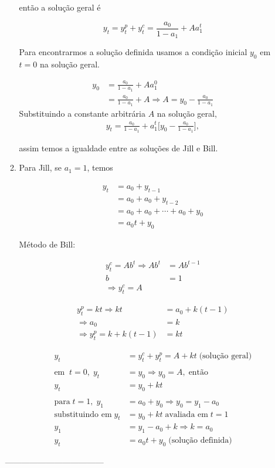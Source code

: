 \begin{enumerate}
\begin{enumerate}
	então a solução geral é
	
	\begin{equation*}
		y_t=y_t^p+y_t^c=\frac{a_0}{1-a_1}+Aa_1^t
	\end{equation*}
	
	Para encontrarmos a solução definida usamos a condição inicial $y_0$ em $t=0$ na solução geral.
	
	\begin{align*}
		y_0&=\frac{a_0}{1-a_1}+Aa_1^0\\
		&= \frac{a_0}{1-a_1}+A \Rightarrow A=y_0-\frac{a_0}{1-a_1}
	\end{align*}
	Substituindo a constante arbitrária $A$ na solução geral, 
	\begin{align*}
		y_t=\frac{a_0}{1-a_1}+a_1^t\bigg[y_0-\frac{a_0}{1-a_1}\bigg],
	\end{align*}
	
	assim temos a igualdade entre as soluções de Jill e Bill.
	
\item Para Jill, se $a_1=1$, temos
	
	\begin{align*}
	y_t&=a_0+y_{t-1}\\
	&=a_0+a_0+y_{t-2}\\
	&=a_0+a_0+\cdots+a_0+y_0\\
	&=a_0t+y_0
	\end{align*}
	
	Método de Bill:
	
	\begin{align*}
		y_t^c=Ab^t \Rightarrow Ab^t&=Ab^{t-1}\\
		b&=1\\
		\Rightarrow y_t^c=A	&
	\end{align*}
	
	\begin{align*}
		y_t^p=kt \Rightarrow kt&=a_0+k(t-1)\\
		\Rightarrow a_0&=k\\
		\Rightarrow y_t^p=k+k(t-1)&=kt
	\end{align*}
	
	\begin{align*}
		y_t&=y_t^c+y_t^p=A+kt \;\text{(solução geral)}\\
		\\
	\text{em}\;\; t=0,\; y_t&=y_0 \Rightarrow y_0=A,\; \text{então}\\
	y_t&=y_0+kt\\
	\\
	\text{para}\; t=1,\; y_1&=a_0+y_0\Rightarrow y_0=y_1-a_0\\
	\text{substituindo em}\; y_t&=y_0+kt\; \text{avaliada em} \;t=1\\
	y_1&=y_1-a_0+k \Rightarrow k=a_0\\
	y_t&=a_0t+y_0 \;\text{(solução definida)}
	\end{align*}
\end{enumerate}
	------------------------------------
	

\end{enumerate}
